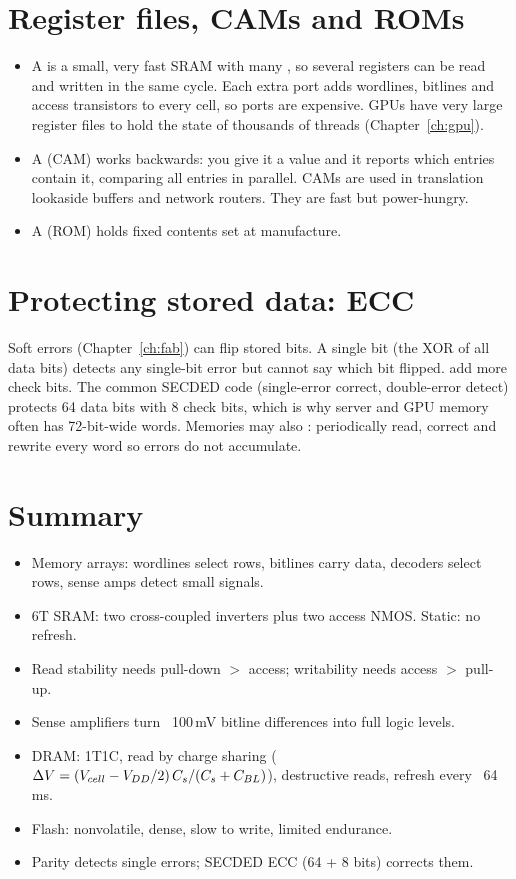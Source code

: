 \section{Register files, CAMs and ROMs}

\begin{itemize}
  \item A  is a small, very fast SRAM with many , so several registers can be read and written in the same cycle. Each extra port adds wordlines, bitlines and access transistors to every cell, so ports are expensive. GPUs have very large register files to hold the state of thousands of threads (Chapter~\ref{ch:gpu}).
  \item A  (CAM) works backwards: you give it a value and it reports which entries contain it, comparing all entries in parallel. CAMs are used in translation lookaside buffers and network routers. They are fast but power-hungry.
  \item A  (ROM) holds fixed contents set at manufacture.
\end{itemize}

\section{Protecting stored data: ECC}

Soft errors (Chapter~\ref{ch:fab}) can flip stored bits. A single  bit (the XOR of all data bits) detects any single-bit error but cannot say which bit flipped.  add more check bits. The common SECDED code (single-error correct, double-error detect) protects 64 data bits with 8 check bits, which is why server and GPU memory often has 72-bit-wide words. Memories may also : periodically read, correct and rewrite every word so errors do not accumulate.

\section{Summary}

\begin{itemize}
  \item Memory arrays: wordlines select rows, bitlines carry data, decoders select rows, sense amps detect small signals.
  \item 6T SRAM: two cross-coupled inverters plus two access NMOS. Static: no refresh.
  \item Read stability needs pull-down $>$ access; writability needs access $>$ pull-up.
  \item Sense amplifiers turn ~100\,mV bitline differences into full logic levels.
  \item DRAM: 1T1C, read by charge sharing ($\Delta V = (V_{cell} - V_{DD}/2)\,C_s/(C_s + C_{BL})$), destructive reads, refresh every ~64\,ms.
  \item Flash: nonvolatile, dense, slow to write, limited endurance.
  \item Parity detects single errors; SECDED ECC (64 + 8 bits) corrects them.
\end{itemize}

